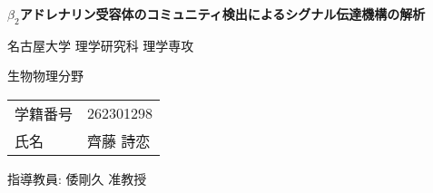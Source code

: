 \begin{titlepage}
    \centering
    \vfill
    \fontsize{40pt}{28pt}\selectfont
    \textbf{$\beta_2$アドレナリン受容体のコミュニティ検出によるシグナル伝達機構の解析}
    \vspace{80pt}

    \fontsize{20pt}{18pt}\selectfont
    名古屋大学 理学研究科 理学専攻  
    \vspace{5pt}

    生物物理分野  
    \vspace{15pt}

    \fontsize{20pt}{19pt}\selectfont
    \begin{tabular}{ll}
        学籍番号 & 262301298 \\
        氏名   & 齊藤 詩恋 \\
    \end{tabular}
    \vspace{20pt}

    \fontsize{20pt}{19pt}\selectfont
    指導教員: 倭剛久 准教授
    \vfill
    
\end{titlepage}
